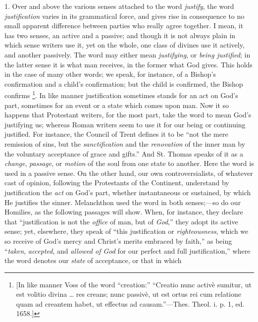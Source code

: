 1. Over and above the various senses attached to the word \emph{justify},
the word \emph{justification} varies in its grammatical force, and
gives rise in consequence to no small apparent difference between
parties who really agree together. I mean, it has two senses, an
active and a passive; and though it is not always plain in which
sense writers use it, yet on the whole, one class of divines use it
actively, and another passively. The word may either mean \emph{justifying},
or \emph{being justified}; in the latter sense it is what man
receives, in the former what God gives. This holds in the case of many
other words; we speak, for instance, of a Bishop's confirmation and a
child's confirmation; but the child is confirmed, the Bishop confirms
\footnote{[In like manner
Voss of the word ``creation:'' ``Creatio nunc activè
sumitur, ut est volitio divina … res creans; nunc passivè, ut est
ortus rei cum relatione quam ad creantem habet, ut effectus ad causam.''—Thes.
Theol. i. p. 1, ed. 1658.]}. In like manner
justification sometimes stands for an act on God's part, sometimes for
an event or a state which comes upon man. Now it so happens that
Protestant writers, for the most part, take the word to mean God's
justifying us; whereas Roman writers seem to use it for our being or
continuing justified. For instance, the Council of Trent defines it to
be ``not the mere remission of sins, but the \emph{sanctification}
and the \emph{renovation} of the inner man by the voluntary acceptance
of grace and gifts.'' And St. Thomas speaks of it as a \emph{change},
\emph{passage}, or \emph{motion} of the soul from one state to
another. Here the word is used in a passive sense. On the other hand,
our own controversialists, of whatever cast of opinion, following the
Protestants of the Continent, understand by justification the \emph{act}
on God's part, whether instantaneous or sustained, by which He
justifies the sinner. Melanchthon used the word in both senses;—so
do our Homilies, as the following passages will show. When, for
instance, they declare that ``justification is not the \emph{office}
of man, but of \emph{God},'' they adopt its active sense; yet,
elsewhere, they speak of ``this justification or \emph{righteousness},
which we so receive of God's mercy and Christ's merits embraced by
faith,'' as being ``\emph{taken}, \emph{accepted}, and \emph{allowed
of God} for our perfect and full justification,'' where the
word denotes our \emph{state} of acceptance, or that in which
